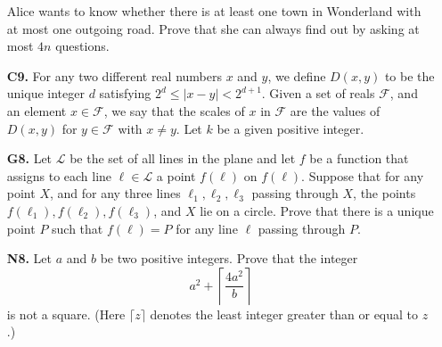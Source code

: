 \documentclass[11pt,a4paper]{article}
\begin{document}
\begin{enumerate}
	Alice wants to know whether there is at least one town in Wonderland with at most one outgoing road. Prove that she can always find out by asking at most $4n$ questions.
	
	\item [\textbf{C9.}] For any two different real numbers $x$ and $y$, we define $D(x,y)$ to be the unique integer $d$ satisfying $2^d\le |x-y| < 2^{d+1}$. Given a set of reals $\mathcal F$, and an element $x\in \mathcal F$, we say that the scales of $x$ in $\mathcal F$ are the values of $D(x,y)$ for $y\in\mathcal F$ with $x\neq y$. Let $k$ be a given positive integer.
	
	\item [\textbf{G8.}] Let $\mathcal L$ be the set of all lines in the plane and let $f$ be a function that assigns to each line $\ell\in\mathcal L$ a point $f(\ell)$ on $f(\ell)$. Suppose that for any point $X$, and for any three lines $\ell_1,\ell_2,\ell_3$ passing through $X$, the points $f(\ell_1),f(\ell_2),f(\ell_3)$, and $X$ lie on a circle.
	Prove that there is a unique point $P$ such that $f(\ell)=P$ for any line $\ell$ passing through $P$.
	
	
	\item[\textbf{N8.}] Let $a$ and $b$ be two positive integers. Prove that the integer
	\[a^2+\left\lceil\frac{4a^2}b\right\rceil\]is not a square. (Here $\lceil z\rceil$ denotes the least integer greater than or equal to $z$.)
	
\end{enumerate}



\newpage
\end{document}
